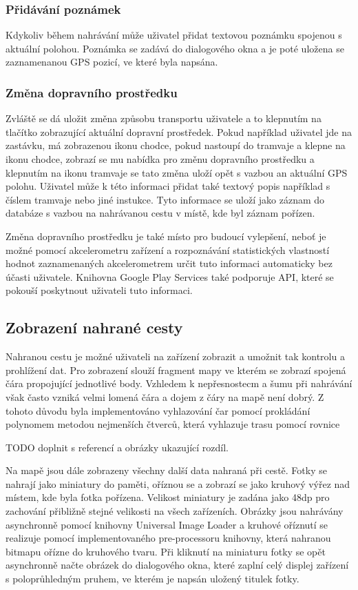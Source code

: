 \documentclass{article}
\begin{document}
\subsubsection{Přidávání poznámek}
Kdykoliv během nahrávání může uživatel přidat textovou poznámku spojenou s aktuální polohou.
 Poznámka se zadává do dialogového okna a je poté uložena se zaznamenanou GPS pozicí, ve které byla napsána.

\subsubsection{Změna dopravního prostředku}
Zvláště se dá uložit změna způsobu transportu uživatele a to klepnutím na tlačítko zobrazující
aktuální dopravní prostředek. Pokud například uživatel jde na zastávku, má zobrazenou ikonu chodce,
pokud nastoupí do tramvaje a klepne na ikonu chodce, zobrazí se mu nabídka pro změnu dopravního
prostředku a klepnutím na ikonu tramvaje se tato změna uloží opět s vazbou an aktuální GPS polohu.
Uživatel může k této informaci přidat také textový popis například s číslem tramvaje nebo jiné instukce.
Tyto informace se uloží jako záznam do databáze s vazbou na nahrávanou cestu v místě, kde byl záznam pořízen.

Změna dopravního prostředku je také místo pro budoucí vylepšení, neboť je možné pomocí akcelerometru
zařízení a rozpoznávání statistických vlastností hodnot zaznamenaných akcelerometrem určit tuto informaci
automaticky bez účasti uživatele. Knihovna Google Play Services také podporuje API, které se pokouší
poskytnout uživateli tuto informaci.


\subsection{Zobrazení nahrané cesty}
Nahranou cestu je možné uživateli na zařízení zobrazit a umožnit tak kontrolu a prohlížení dat.
Pro zobrazení slouží fragment mapy ve kterém se zobrazí spojená čára propojující jednotlivé body.
Vzhledem k nepřesnostecm a šumu při nahrávání však často vzniká velmi lomená čára a dojem z čáry
na mapě není dobrý. Z tohoto důvodu byla implementováno vyhlazování čar pomocí prokládání polynomem
metodou nejmenších čtverců, která vyhlazuje trasu pomocí rovnice

TODO doplnit s referencí a obrázky ukazující rozdíl.


Na mapě jsou dále zobrazeny všechny další data nahraná při cestě. Fotky se nahrají jako miniatury do paměti,
oříznou se a zobrazí se jako kruhový výřez nad místem, kde byla fotka pořízena.
Velikost miniatury je zadána jako 48dp pro zachování přibližně stejné velikosti na všech zařízeních.
Obrázky jsou nahrávány asynchronně pomocí knihovny Universal Image Loader a kruhové oříznutí se realizuje
pomocí implementovaného pre-processoru knihovny, která nahranou bitmapu ořízne do kruhového tvaru.
Při kliknutí na miniaturu fotky se opět asynchronně načte obrázek do dialogového okna,
které zaplní celý displej zařízení s poloprůhledným pruhem, ve kterém je napsán uložený titulek fotky.
\end{document}
